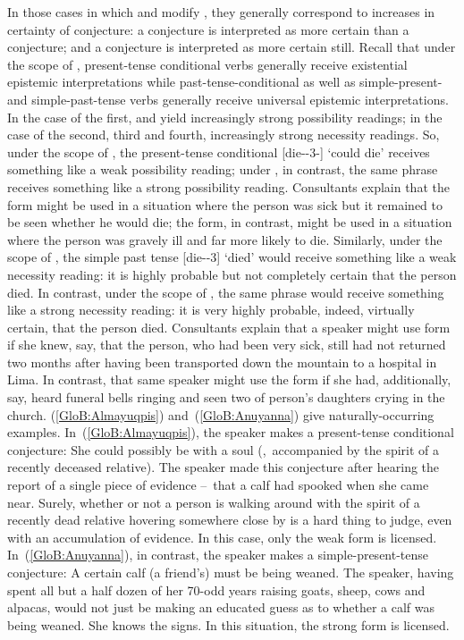 In those cases in which  and  modify , they generally correspond to increases in certainty of conjecture: a  conjecture is interpreted as more certain than a  conjecture; and a  conjecture is interpreted as more certain still. Recall that under the scope of , present-tense conditional verbs generally receive existential epistemic interpretations while past-tense-conditional as well as simple-present- and simple-past-tense verbs generally receive universal epistemic interpretations. In the case of the first,  and  yield increasingly strong possibility readings; in the case of the second, third and fourth, increasingly strong necessity readings. So, under the scope of , the present-tense conditional  [die--3-] ‘could die’ receives something like a weak possibility reading; under , in contrast, the same phrase receives something like a strong possibility reading. Consultants explain that the \phono{-\uo} form might be used in a situation where the person was sick but it remained to be seen whether he would die; the  form, in contrast, might be used in a situation where the person was gravely ill and far more likely to die. Similarly, under the scope of , the simple past tense  [die--3] ‘died’ would receive something like a weak necessity reading: it is highly probable but not completely certain that the person died. In contrast, under the scope of , the same phrase would receive something like a strong necessity reading: it is very highly probable, indeed, virtually certain, that the person died. Consultants explain that a speaker might use \phono{-\uo} form if she knew, say, that the person, who had been very sick, still had not returned two months after having been transported down the mountain to a hospital in Lima. In contrast, that same speaker might use the  form if she had, additionally, say, heard funeral bells ringing and seen two of person’s daughters crying in the church. (\ref{GloB:Almayuqpis}) and~(\ref{GloB:Anuyanna}) give naturally-occurring examples. In~(\ref{GloB:Almayuqpis}), the speaker makes a present-tense conditional  conjecture: She could possibly be with a soul (\ie,~accompanied by the spirit of a recently deceased relative). The speaker made this conjecture after hearing the report of a single piece of evidence --~that a calf had spooked when she came near. Surely, whether or not a person is walking around with the spirit of a recently dead relative hovering somewhere close by is a hard thing to judge, even with an accumulation of evidence. In this case, only the weak \phono{-\uo} form is licensed. In~(\ref{GloB:Anuyanna}), in contrast, the speaker makes a simple-present-tense  conjecture: A certain calf (a friend’s) must be being weaned. The speaker, having spent all but a half dozen of her 70-odd years raising goats, sheep, cows and alpacas, would not just be making an educated guess as to whether a calf was being weaned. She knows the signs. In this situation, the strong  form is licensed.\\

